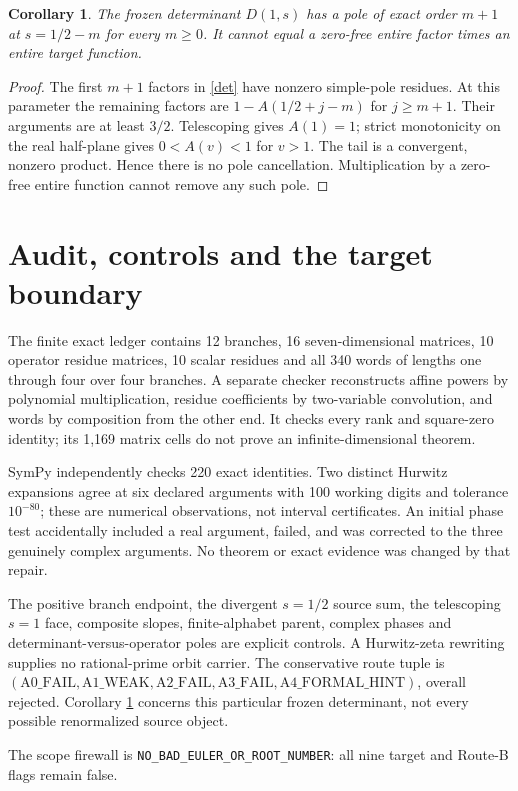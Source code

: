 \documentclass[10pt]{article}
\newtheorem{corollary}{Corollary}
\begin{document}
\begin{corollary}\label{obstruction}
The frozen determinant $D(1,s)$ has a pole of exact order $m+1$ at
$s=1/2-m$ for every $m\ge0$.
It cannot equal a zero-free entire factor times an entire target function.
\end{corollary}
\begin{proof}
The first $m+1$ factors in \eqref{det} have nonzero simple-pole residues.
At this parameter the remaining factors are $1-A(1/2+j-m)$ for $j\ge m+1$.
Their arguments are at least $3/2$. Telescoping gives $A(1)=1$;
strict monotonicity on the real half-plane gives $0<A(v)<1$ for $v>1$.
The tail is a convergent, nonzero product. Hence there is no pole cancellation.
Multiplication by a zero-free entire function cannot remove any such pole.
\end{proof}

\section{Audit, controls and the target boundary}
The finite exact ledger contains 12 branches, 16 seven-dimensional matrices,
10 operator residue matrices, 10 scalar residues and all 340 words of
lengths one through four over four branches. A separate checker reconstructs
affine powers by polynomial multiplication, residue coefficients by
two-variable convolution, and words by composition from the other end.
It checks every rank and square-zero identity; its 1,169 matrix cells
do not prove an infinite-dimensional theorem.

SymPy independently checks 220 exact identities.
Two distinct Hurwitz expansions agree at six declared arguments with
100 working digits and tolerance $10^{-80}$; these are numerical
observations, not interval certificates. An initial phase test accidentally
included a real argument, failed, and was corrected to the three genuinely
complex arguments. No theorem or exact evidence was changed by that repair.

The positive branch endpoint, the divergent $s=1/2$ source sum,
the telescoping $s=1$ face, composite slopes, finite-alphabet parent,
complex phases and determinant-versus-operator poles are explicit controls.
A Hurwitz-zeta rewriting supplies no rational-prime orbit carrier.
The conservative route tuple is
$(\mathrm{A0\_FAIL},\mathrm{A1\_WEAK},\mathrm{A2\_FAIL},
\mathrm{A3\_FAIL},\mathrm{A4\_FORMAL\_HINT})$,
overall rejected. Corollary \ref{obstruction} concerns this particular
frozen determinant, not every possible renormalized source object.
\par\noindent The scope firewall is
\texttt{NO\_BAD\_EULER\_OR\_ROOT\_NUMBER}:
all nine target and Route-B flags remain false.
\fi
\end{document}
